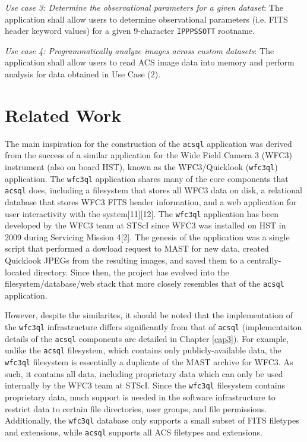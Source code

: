\documentclass[10pt,journal,compsoc]{IEEEtran}
\begin{document}
\textit{Use case 3: Determine the observational parameters for a given dataset}: The application shall allow users to determine observational parameters (i.e. FITS header keyword values) for
a given 9-character \texttt{IPPPSSOTT} rootname.

\textit{Use case 4: Programmatically analyze images across custom datasets}: The application shall allow users to read ACS image data into memory and perform analysis for data obtained
in Use Case (2).


\section{Related Work} \label{chap2}

The main inspiration for the construction of the \texttt{acsql} application was derived from the success of a similar application for the Wide Field Camera 3 (WFC3) instrument
(also on board HST), known as the WFC3/Quicklook (\texttt{wfc3ql}) application.  The \texttt{wfc3ql} application shares many of the core components that \texttt{acsql} does,
including a filesystem that stores all WFC3 data on disk, a relational database that stores WFC3 FITS header information, and a web application for user interactivity with the
system[11][12].  The \texttt{wfc3ql} application has been developed by the WFC3 team at STScI since WFC3 was installed on HST in 2009 during Servicing Mission 4[2].  The genesis of
the application was a single script that performed a dowload request to MAST for new data, created Quicklook JPEGs from the resulting images, and saved them to a centrally-located
directory.  Since then, the project has evolved into the filesystem/database/web stack that more closely resembles that of the \texttt{acsql} application.

However, despite the similarites, it should be noted that the implementation of the \texttt{wfc3ql} infrastructure differs significantly from that of \texttt{acsql}
(implementaiton details of the \texttt{acsql} components are detailed in Chapter \ref{cap3}).  For example, unlike the \texttt{acsql} filesystem, which contains only
publicly-available data, the \texttt{wfc3ql} filesystem is essentially a duplicate of the MAST archive for WFC3.  As such, it contains all data, including proprietary data which can
only be used internally by the WFC3 team at STScI.  Since the \texttt{wfc3ql} filesystem contains proprietary data, much support is needed in the software infrastructure to restrict
data to certain file directories, user groups, and file permissions.  Additionally, the \texttt{wfc3ql} database only supports a small subset of FITS filetypes and extensions, while
\texttt{acsql} supports all ACS filetypes and extensions.
\end{document}
